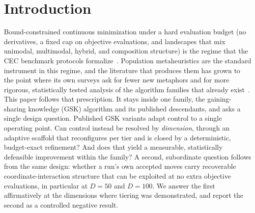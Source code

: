 \section{Introduction}\label{sec:introduction}

Bound-constrained continuous minimization under a hard evaluation
budget (no derivatives, a fixed cap on objective evaluations, and
landscapes that mix unimodal, multimodal, hybrid, and composition
structure) is the regime that the CEC benchmark protocols
formalize~\cite{awad2016problem,das2011cec2011}. %
Population metaheuristics are the standard instrument in this regime,
and the literature that produces them has grown to the point where its
own surveys ask for fewer new metaphors and for more rigorous,
statistically tested analysis of the algorithm families that already
exist~\cite{hussain2019metaheuristic,del2019bio}.
This paper follows that prescription. It stays inside one family, the
gaining-sharing knowledge (GSK) algorithm and its published descendants,
and asks a single design question. Published GSK variants adapt control to a single
operating point. Can control instead be resolved by \emph{dimension}, through
an adaptive scaffold that reconfigures per tier and is closed by a
deterministic, budget-exact refinement? And does that yield a measurable,
statistically defensible improvement within the family?
A second, subordinate question follows from the same design: whether a run's
own accepted moves carry recoverable coordinate-interaction structure that
can be exploited at no extra objective evaluations, in particular at
$D = 50$ and $D = 100$. We answer the first affirmatively at the dimensions
where tiering was demonstrated, and report the second as a controlled negative
result.

